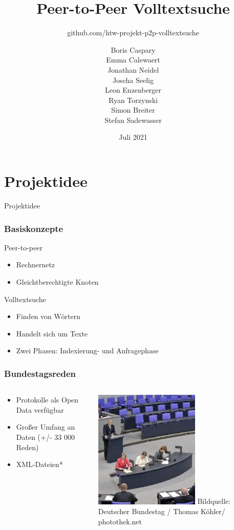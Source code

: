 \documentclass{beamer}
\title{Peer-to-Peer Volltextsuche}
\subtitle{github.com/htw-projekt-p2p-volltextsuche}
\author{
  Boris Caspary \\
  Emma Calewaert \\
  Jonathan Neidel \\
  Joscha Seelig \\
  Leon Enzenberger \\
  Ryan Torzynski \\
  Simon Breiter \\
  Stefan Sadewasser \\
}
\date{Juli 2021}
\institute{HTW Berlin, Angewandte Informatik, Projektstudium bei Herr Hoppe}
\begin{document}
\frame{\titlepage}

\section{Projektidee}
\begin{frame}
  \begin{center}
    {\Huge Projektidee}
  \end{center}
\end{frame}

\begin{frame}[allowframebreaks]
  \frametitle{Basiskonzepte}
  Peer-to-peer
  \begin{itemize}
    \item Rechnernetz
    \item Gleichtberechtigte Knoten
  \end{itemize}

  \break
  Volltextsuche
    \begin{itemize}
    \item Finden von Wörtern
    \item Handelt sich um Texte
    \item Zwei Phasen: Indexierung- und Anfragephase
  \end{itemize}
\end{frame}

\begin{frame}
  \frametitle{Bundestagsreden}
  \begin{columns}
    \begin{column}{0.5\textwidth}
      \begin{itemize}
        \item Protokolle als Open Data verfügbar
        \item Großer Umfang an Daten (+/- 33 000 Reden)
        \item XML-Dateien*
      \end{itemize}
    \end{column}
    \begin{column}{0.5\textwidth}
      \includegraphics[width=5cm]{BundestagProtokoll}
      {\tiny Bildquelle: Deutscher Bundestag / Thomas Köhler/ photothek.net}
    \end{column}
  \end{columns}
\end{frame}
\end{document}
